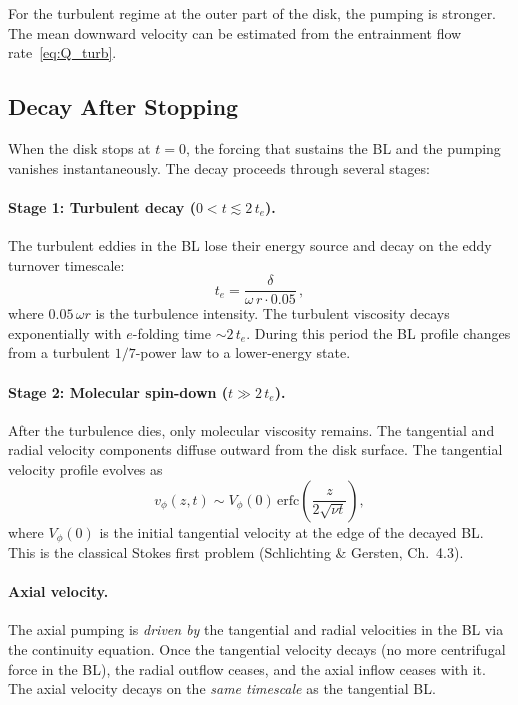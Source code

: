 \documentclass[11pt,a4paper]{article}
\begin{document}
For the turbulent regime at the outer part of the disk, the pumping is
stronger. The mean downward velocity can be estimated from the
entrainment flow rate~\eqref{eq:Q_turb}.

\subsection{Decay After Stopping}

When the disk stops at $t = 0$, the forcing that sustains the BL and
the pumping vanishes instantaneously. The decay proceeds through
several stages:

\paragraph{Stage 1: Turbulent decay ($0 < t \lesssim 2\,t_e$).}
The turbulent eddies in the BL lose their energy source and decay on
the eddy turnover timescale:
\begin{equation}
  t_e = \frac{\delta}{\omega\,r \cdot 0.05}\,,
\end{equation}
where $0.05\,\omega r$ is the turbulence intensity. The turbulent
viscosity decays exponentially with $e$-folding time $\sim 2\,t_e$.
During this period the BL profile changes from a turbulent
$1/7$-power law to a lower-energy state.

\paragraph{Stage 2: Molecular spin-down ($t \gg 2\,t_e$).}
After the turbulence dies, only molecular viscosity remains. The
tangential and radial velocity components diffuse outward from the
disk surface. The tangential velocity profile evolves as
\begin{equation}
  v_\phi(z,t) \sim V_\phi(0)\,
    \mathrm{erfc}\!\left(\frac{z}{2\sqrt{\nu t}}\right),
\end{equation}
where $V_\phi(0)$ is the initial tangential velocity at the edge of
the decayed BL. This is the classical Stokes first problem
(Schlichting \& Gersten, Ch.~4.3).

\paragraph{Axial velocity.}
The axial pumping is \emph{driven by} the tangential and radial
velocities in the BL via the continuity equation. Once the tangential
velocity decays (no more centrifugal force in the BL), the radial
outflow ceases, and the axial inflow ceases with it. The axial
velocity decays on the \emph{same timescale} as the tangential BL.
\end{document}
